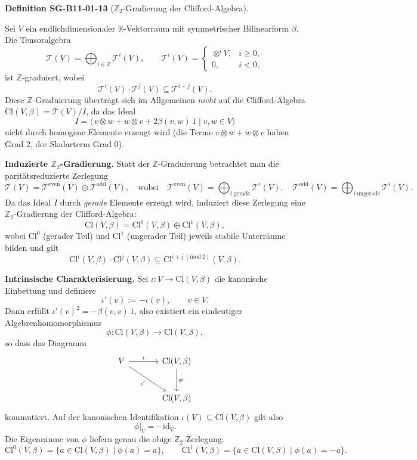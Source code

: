 \documentclass[10pt, letterpaper]{article}
\newcommand{\Cl}{\mathrm{Cl}}
\newcommand{\CustomHeading}[3]{%
  \par\medskip\noindent%
  \textbf{#1 #2} \textnormal{(#3)}.\enskip%
}
\newenvironment{DEF}[2]{\begin{unitbox}\CustomHeading{Definition}{#1}{#2}}{\end{unitbox}}
\begin{document}
\begin{DEF}{SG-B11-01-13}{\(\mathbb{Z}_2\)-Gradierung der Clifford-Algebra}
Sei $V$ ein endlichdimensionaler $\mathbb{K}$-Vektorraum mit symmetrischer Bilinearform $\beta$.
Die Tensoralgebra
\[
\mathcal{T}(V)=\bigoplus_{i\in\mathbb{Z}} \mathcal{T}^{i}(V), \qquad
\mathcal{T}^{i}(V)=
\begin{cases}
\otimes^{i}V, & i\ge0,\\
0, & i<0,
\end{cases}
\]
ist $\mathbb{Z}$-graduiert, wobei
\[
\mathcal{T}^{i}(V)\cdot \mathcal{T}^{j}(V)\subseteq \mathcal{T}^{i+j}(V).
\]
Diese $\mathbb{Z}$-Graduierung überträgt sich im Allgemeinen \emph{nicht} auf die Clifford-Algebra
\(\Cl(V,\beta)=\mathcal{T}(V)/I\), da das Ideal
\[
I=\langle\,v\otimes w+w\otimes v+2\beta(v,w)\,1 \mid v,w\in V\rangle
\]
nicht durch homogene Elemente erzeugt wird (die Terme $v\otimes w+w\otimes v$ haben Grad $2$, der Skalarterm Grad $0$).

\medskip
\textbf{Induzierte \(\mathbb{Z}_{2}\)-Gradierung.}
Statt der $\mathbb{Z}$-Graduierung betrachtet man die paritätsreduzierte Zerlegung
\[
\mathcal{T}(V)
=\mathcal{T}^{\mathrm{even}}(V)\oplus \mathcal{T}^{\mathrm{odd}}(V),
\quad
\text{wobei}\quad
\mathcal{T}^{\mathrm{even}}(V)=\bigoplus_{i\ \mathrm{gerade}}\mathcal{T}^{i}(V),\quad
\mathcal{T}^{\mathrm{odd}}(V)=\bigoplus_{i\ \mathrm{ungerade}}\mathcal{T}^{i}(V).
\]
Da das Ideal $I$ durch \emph{gerade} Elemente erzeugt wird, induziert diese Zerlegung eine
$\mathbb{Z}_{2}$-Gradierung der Clifford-Algebra:
\[
\Cl(V,\beta)=\Cl^{0}(V,\beta)\oplus \Cl^{1}(V,\beta),
\]
wobei $\Cl^{0}$ (gerader Teil) und $\Cl^{1}$ (ungerader Teil) jeweils stabile Unterräume bilden und gilt
\[
\Cl^{i}(V,\beta)\cdot \Cl^{j}(V,\beta)\subseteq \Cl^{i+j\ (\mathrm{mod}\ 2)}(V,\beta).
\]

\medskip
\textbf{Intrinsische Charakterisierung.}
Sei $\iota:V\to \Cl(V,\beta)$ die kanonische Einbettung und definiere
\[
\iota'(v):=-\iota(v),\qquad v\in V.
\]
Dann erfüllt $\iota'(v)^{2}=-\beta(v,v)\,1$, also existiert ein eindeutiger
Algebrenhomomorphismus
\[
\phi:\Cl(V,\beta)\longrightarrow \Cl(V,\beta),
\]
so dass das Diagramm
\[
\begin{tikzcd}[row sep=large, column sep=large]
V \arrow[r, "\iota"] \arrow[dr, "\iota'"'] & \Cl(V,\beta) \arrow[d, "\phi"] \\
& \Cl(V,\beta)
\end{tikzcd}
\]
kommutiert.
Auf der kanonischen Identifikation $\iota(V)\subseteq \Cl(V,\beta)$ gilt also
\[
\phi|_{V}=-\mathrm{id}_{V}.
\]
Die Eigenräume von $\phi$ liefern genau die obige $\mathbb{Z}_{2}$-Zerlegung:
\[
\Cl^{0}(V,\beta)=\{a\in \Cl(V,\beta)\mid \phi(a)=a\},\qquad
\Cl^{1}(V,\beta)=\{a\in \Cl(V,\beta)\mid \phi(a)=-a\}.
\]
\end{DEF}
\end{document}

